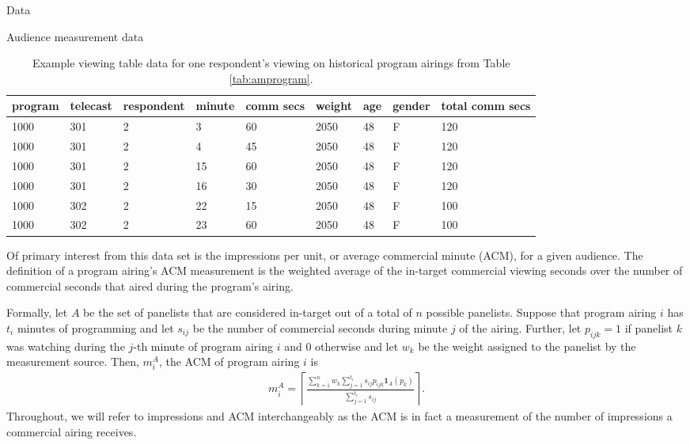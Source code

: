 \begin{chapter}{Data}
\begin{section}{Audience measurement data}
  \begin{table}[h!]
    \centering
    \begin{adjustbox}{width=1.1\textwidth,center=\textwidth}
      \large
    \begin{tabular}{lllllllll}
      program & telecast & respondent & minute & comm secs & weight & age & gender & total comm secs\\
      \hline
      1000 & 301 & 2 & 3 & 60 & 2050 & 48 & F & 120\\
      1000 & 301 & 2 & 4 & 45 & 2050 & 48 & F & 120\\
      1000 & 301 & 2 & 15 & 60 & 2050 & 48 & F & 120\\
      1000 & 301 & 2 & 16 & 30 & 2050 & 48 & F & 120\\
      1000 & 302 & 2 & 22 & 15 & 2050 & 48 & F & 100\\
      1000 & 302 & 2 & 23 & 60 & 2050 & 48 & F & 100
    \end{tabular}
    \end{adjustbox}
    \caption{Example viewing table data for one respondent's viewing on historical program airings from Table \ref{tab:amprogram}.}\label{tab:amviewing}
  \end{table}

  Of primary interest from this data set is the impressions per unit,
  or average commercial minute (ACM), for a given audience.
  The definition of a program airing's ACM measurement is the weighted average
  of the in-target commercial viewing seconds over the number of commercial seconds
  that aired during the program's airing.

  Formally, let $A$ be the set of panelists that are considered in-target out of a total of $n$ possible panelists.
  Suppose that program airing $i$ has $t_i$ minutes of programming and let
  $s_{ij}$ be the number of commercial seconds during minute $j$ of the airing.
  Further, let $p_{ijk} = 1$ if panelist $k$ was watching during the $j$-th minute of program airing $i$ and 0 otherwise
  and let $w_{k}$ be the weight assigned to the panelist by the measurement source. Then, $m_{i}^A$, the ACM of program airing $i$
  is
  \begin{align}\label{acm_def}
    m_{i}^A = \left\lceil\frac{\sum_{k=1}^n w_k \sum_{j=1}^{t_i} s_{ij} p_{ijk} \textbf{1}_A(p_{k})}{\sum_{j=1}^{t_i} s_{ij}}\right\rceil.
  \end{align}
  Throughout, we will refer to impressions and ACM interchangeably as the ACM is in fact a measurement
  of the number of impressions a commercial airing receives.


\end{section}
\end{chapter}
